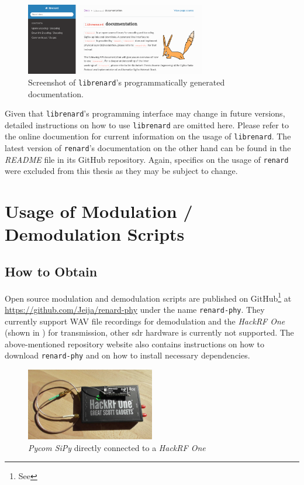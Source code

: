 \begin{appendix}
\begin{figure}[h]
	\centering
	\includegraphics[width=0.7\textwidth]{fig/librenard_doc_screenshot.png}
	\caption{Screenshot of \texttt{librenard}'s programmatically generated documentation.}
	\label{fig:librenard_rtd}
\end{figure}

Given that \texttt{librenard}'s programming interface may change in future versions, detailed instructions on how to use \texttt{librenard} are omitted here.
Please refer to the online documention for current information on the usage of \texttt{librenard}.
The latest version of \texttt{renard}'s documentation on the other hand can be found in the \textit{README} file in its GitHub repository.
Again, specifics on the usage of \texttt{renard} were excluded from this thesis as they may be subject to change.

\FloatBarrier
\section{Usage of Modulation / Demodulation Scripts}
\label{sec:demodscripts}
\subsection{How to Obtain}
Open source modulation and demodulation scripts are published on GitHub\footnote{See } at \url{https://github.com/Jeija/renard-phy} under the name \texttt{renard-phy}.
They currently support WAV file recordings for demodulation and the \textit{HackRF One} (shown in ) for transmission, other \gls{sdr} hardware is currently not supported.
The above-mentioned repository website also contains instructions on how to download \texttt{renard-phy} and on how to install necessary dependencies.

\begin{figure}[h]
	\centering
	\includegraphics[width=0.5\textwidth]{fig/hackrf.png}
	\caption{\textit{Pycom SiPy} directly connected to a \textit{HackRF One}}
	\label{fig:hackrf_sipy}
\end{figure}


\end{appendix}
